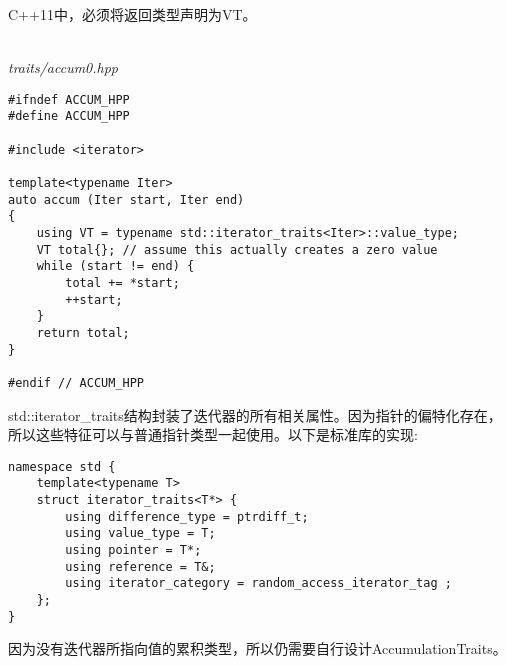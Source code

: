 \begin{tcolorbox}[colback=webgreen!5!white,colframe=webgreen!75!black]
\hspace*{0.75cm}C++11中，必须将返回类型声明为VT。
\end{tcolorbox}

\hspace*{\fill} \\ %
\noindent
\textit{traits/accum0.hpp}
\begin{lstlisting}[style=styleCXX]
#ifndef ACCUM_HPP
#define ACCUM_HPP

#include <iterator>

template<typename Iter>
auto accum (Iter start, Iter end)
{
	using VT = typename std::iterator_traits<Iter>::value_type;
	VT total{}; // assume this actually creates a zero value
	while (start != end) {
		total += *start;
		++start;
	}
	return total;
}

#endif // ACCUM_HPP
\end{lstlisting}

std::iterator\_traits结构封装了迭代器的所有相关属性。因为指针的偏特化存在，所以这些特征可以与普通指针类型一起使用。以下是标准库的实现:

\begin{lstlisting}[style=styleCXX]
namespace std {
	template<typename T>
	struct iterator_traits<T*> {
		using difference_type = ptrdiff_t;
		using value_type = T;
		using pointer = T*;
		using reference = T&;
		using iterator_category = random_access_iterator_tag ;
	};
}
\end{lstlisting}

因为没有迭代器所指向值的累积类型，所以仍需要自行设计AccumulationTraits。









